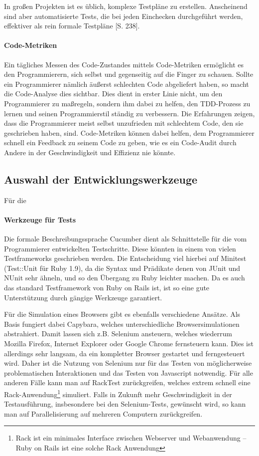 In großen Projekten ist es üblich, komplexe Testpläne zu erstellen. Anscheinend sind aber automatisierte Tests, die bei jeden Einchecken durchgeführt werden, effektiver als rein formale Testpläne \citep{hunt_pragmatic_1999}[S. 238].

\paragraph{Code-Metriken} Ein tägliches Messen des Code-Zustandes mittels Code-Metriken ermöglicht es den Programmierern, sich selbst und gegenseitig auf die Finger zu schauen. Sollte ein Programmierer nämlich äußerst schlechten Code abgeliefert haben, so macht die Code-Analyse dies sichtbar. Dies dient in erster Linie nicht, um den Programmierer zu maßregeln, sondern ihm dabei zu helfen, den TDD-Prozess zu lernen und seinen Programmierstil ständig zu verbessern. Die Erfahrungen zeigen, dass die Programmierer meist selbst unzufrieden mit schlechtem Code, den sie geschrieben haben, sind. Code-Metriken können dabei helfen, dem Programmierer schnell ein Feedback zu seinem Code zu geben, wie es ein Code-Audit durch Andere in der Geschwindigkeit und Effizienz nie könnte.





\subsection{Auswahl der Entwicklungswerkzeuge}

Für die 

\paragraph{Werkzeuge für Tests} Die formale Beschreibungssprache Cucumber dient als Schnittstelle für die vom Programmierer entwickelten Testschritte. Diese könnten in einem von vielen Testframeworks geschrieben werden. Die Entscheidung viel hierbei auf Minitest (Test::Unit für Ruby 1.9), da die Syntax und Prädikate denen von JUnit und NUnit sehr ähneln, und so den Übergang zu Ruby leichter machen. Da es auch das standard Testframework von Ruby on Rails ist, ist so eine gute Unterstützung durch gängige Werkzeuge garantiert.

Für die Simulation eines Browsers gibt es ebenfalls verschiedene Ansätze. Als Basis fungiert dabei Capybara, welches unterschiedliche Browsersimulationen abstrahiert. Damit lassen sich z.B. Selenium ansteuern, welches wiederrum Mozilla Firefox, Internet Explorer oder Google Chrome fernsteuern kann. Dies ist allerdings sehr langsam, da ein kompletter Browser gestartet und ferngesteuert wird. Daher ist die Nutzung von Selenium nur für das Testen von möglicherweise problematischen Interaktionen und das Testen von Javascript notwendig. Für alle anderen Fälle kann man auf RackTest zurückgreifen, welches extrem schnell eine Rack-Anwendung\footnote{Rack ist ein minimales Interface zwischen Webserver und Webanwendung -- Ruby on Rails ist eine solche Rack Anwendung} simuliert.
Falls in Zukunft mehr Geschwindigkeit in der Testausführung, insbesondere bei den Selenium-Tests, gewünscht wird, so kann man auf Parallelisierung auf mehreren Computern zurückgreifen.

